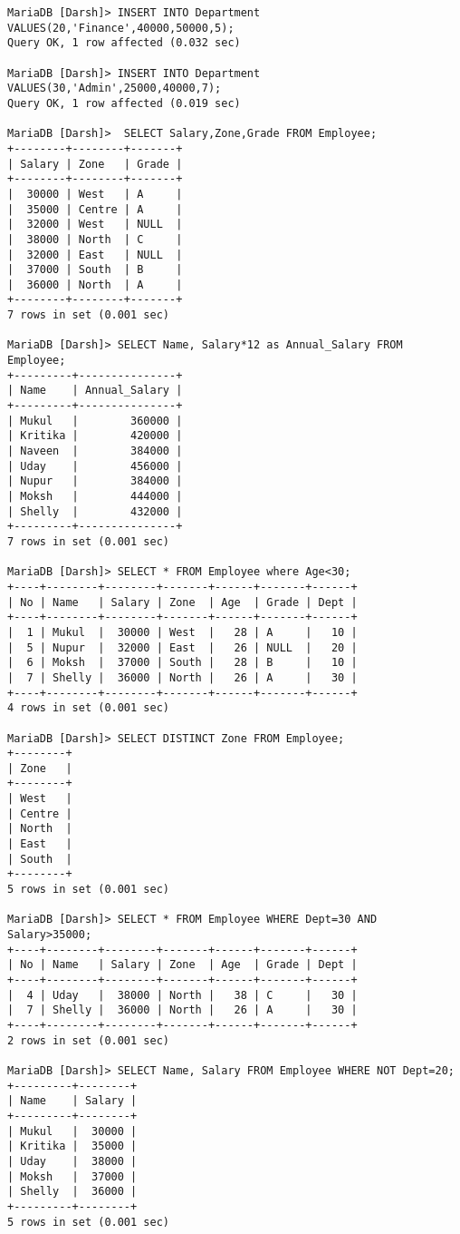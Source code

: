 \documentclass[
a4paper]{article}
\begin{document}
\begin{lstlisting}
MariaDB [Darsh]> INSERT INTO Department VALUES(20,'Finance',40000,50000,5);
Query OK, 1 row affected (0.032 sec)

MariaDB [Darsh]> INSERT INTO Department VALUES(30,'Admin',25000,40000,7);
Query OK, 1 row affected (0.019 sec)

MariaDB [Darsh]>  SELECT Salary,Zone,Grade FROM Employee;
+--------+--------+-------+
| Salary | Zone   | Grade |
+--------+--------+-------+
|  30000 | West   | A     |
|  35000 | Centre | A     |
|  32000 | West   | NULL  |
|  38000 | North  | C     |
|  32000 | East   | NULL  |
|  37000 | South  | B     |
|  36000 | North  | A     |
+--------+--------+-------+
7 rows in set (0.001 sec)

MariaDB [Darsh]> SELECT Name, Salary*12 as Annual_Salary FROM Employee;
+---------+---------------+
| Name    | Annual_Salary |
+---------+---------------+
| Mukul   |        360000 |
| Kritika |        420000 |
| Naveen  |        384000 |
| Uday    |        456000 |
| Nupur   |        384000 |
| Moksh   |        444000 |
| Shelly  |        432000 |
+---------+---------------+
7 rows in set (0.001 sec)

MariaDB [Darsh]> SELECT * FROM Employee where Age<30;
+----+--------+--------+-------+------+-------+------+
| No | Name   | Salary | Zone  | Age  | Grade | Dept |
+----+--------+--------+-------+------+-------+------+
|  1 | Mukul  |  30000 | West  |   28 | A     |   10 |
|  5 | Nupur  |  32000 | East  |   26 | NULL  |   20 |
|  6 | Moksh  |  37000 | South |   28 | B     |   10 |
|  7 | Shelly |  36000 | North |   26 | A     |   30 |
+----+--------+--------+-------+------+-------+------+
4 rows in set (0.001 sec)

MariaDB [Darsh]> SELECT DISTINCT Zone FROM Employee;
+--------+
| Zone   |
+--------+
| West   |
| Centre |
| North  |
| East   |
| South  |
+--------+
5 rows in set (0.001 sec)

MariaDB [Darsh]> SELECT * FROM Employee WHERE Dept=30 AND Salary>35000;
+----+--------+--------+-------+------+-------+------+
| No | Name   | Salary | Zone  | Age  | Grade | Dept |
+----+--------+--------+-------+------+-------+------+
|  4 | Uday   |  38000 | North |   38 | C     |   30 |
|  7 | Shelly |  36000 | North |   26 | A     |   30 |
+----+--------+--------+-------+------+-------+------+
2 rows in set (0.001 sec)

MariaDB [Darsh]> SELECT Name, Salary FROM Employee WHERE NOT Dept=20;
+---------+--------+
| Name    | Salary |
+---------+--------+
| Mukul   |  30000 |
| Kritika |  35000 |
| Uday    |  38000 |
| Moksh   |  37000 |
| Shelly  |  36000 |
+---------+--------+
5 rows in set (0.001 sec)


\end{lstlisting}
\end{document}
